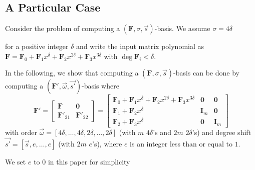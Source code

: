 \subsection{\label{sub:particularCase}A Particular Case}

Consider the problem of computing a $\left(\mathbf{F},\sigma,\vec{s}\right)$-basis.
We assume $\sigma=4\delta$ %
\begin{comment}
(The results below hold for any positive integer great than one, but
4 is used for simplicity. ) 
\end{comment}
{}for a positive integer $\delta$ and write the input matrix polynomial
as $\mathbf{F}=\mathbf{F}_{0}+\mathbf{F}_{1}x^{\delta}+\mathbf{F}_{2}x^{2\delta}+\mathbf{F}_{3}x^{3\delta}$
with $\deg\mathbf{F}_{i}<\delta$.%
\begin{comment}
again, changed from $\deg\mathbf{F}_{i}\le\delta-1$ to $\deg\mathbf{F}_{i}<\delta$
even though I prefer $\le$ 
\end{comment}
{} In the following, we show that computing a $\left(\mathbf{F},\sigma,\vec{s}\right)$-basis
can be done by computing a $(\mathbf{F}',\vec{\omega},\vec{s'})$-basis
where \begin{equation}
\mathbf{F}'=\left[\begin{array}{cc}
\mathbf{F} & \mathbf{0}\\
\mathbf{F}'_{21} & \mathbf{F}'_{22}\end{array}\right]=\left[\begin{array}{c|cr}
\mathbf{F}_{0}+\mathbf{F}_{1}x^{\delta}+\mathbf{F}_{2}x^{2\delta}+\mathbf{F}_{3}x^{3\delta} & \mathbf{0} & \mathbf{0}\\
\hline \mathbf{F}_{1}+\mathbf{F}_{2}x^{\delta} & \mathbf{I}_{m} & \mathbf{0}\\
\mathbf{F}_{2}+\mathbf{F}_{3}x^{\delta} & \mathbf{0} & \mathbf{I}_{m}\end{array}\right]\label{eq:extendedSTransformTop}\end{equation}
 with order $\vec{\omega}=\left[4\delta,\dots,4\delta,2\delta,\dots,2\delta\right]$
(with $m$ $4\delta$'s and $2m$ $2\delta$'s) and degree shift $\vec{s'}=\left[\vec{s},e,\dots,e\right]$
(with $2m$ $e$'s), where $e$ is an integer less than or equal to
$1$. %
\begin{comment}
actually true for $e\le\min\vec{s}+1$. keeping this $e$ helps to
show that this hold true in more general situations, while Storjohann
only used $e=1$. it can be negative as well. 
\end{comment}
{} We set $e$ to $0$ in this paper for simplicity%
